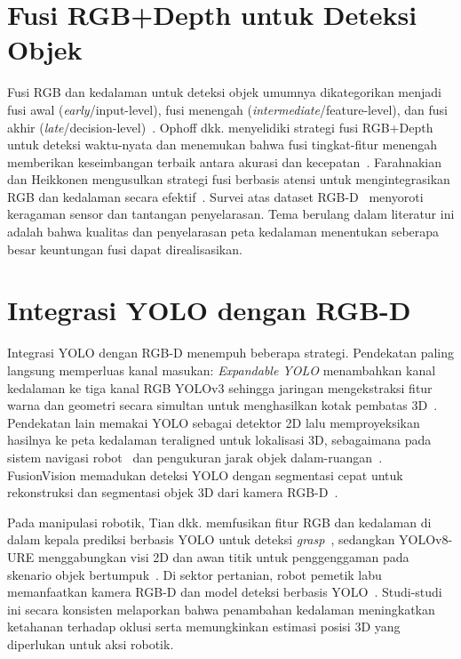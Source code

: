 \documentclass[11pt,a4paper]{article}
\begin{document}
\section{Fusi RGB+Depth untuk Deteksi Objek}
Fusi RGB dan kedalaman untuk deteksi objek umumnya dikategorikan menjadi fusi
awal (\emph{early}/input-level), fusi menengah (\emph{intermediate}/feature-level),
dan fusi akhir (\emph{late}/decision-level)~\cite{ramachandram2017multimodalreview,
feng2021multimodalsurvey}. Ophoff dkk. menyelidiki strategi fusi RGB+Depth untuk
deteksi waktu-nyata dan menemukan bahwa fusi tingkat-fitur menengah memberikan
keseimbangan terbaik antara akurasi dan kecepatan~\cite{ophoff2019multimodal}.
Farahnakian dan Heikkonen mengusulkan strategi fusi berbasis atensi untuk
mengintegrasikan RGB dan kedalaman secara efektif~\cite{farahnakian2021fusion}.
Survei atas dataset RGB-D~\cite{lopes2022rgbddatasets} menyoroti keragaman sensor
dan tantangan penyelarasan. Tema berulang dalam literatur ini adalah bahwa
kualitas dan penyelarasan peta kedalaman menentukan seberapa besar keuntungan
fusi dapat direalisasikan.

\section{Integrasi YOLO dengan RGB-D}
Integrasi YOLO dengan RGB-D menempuh beberapa strategi. Pendekatan paling
langsung memperluas kanal masukan: \emph{Expandable YOLO} menambahkan kanal
kedalaman ke tiga kanal RGB YOLOv3 sehingga jaringan mengekstraksi fitur warna
dan geometri secara simultan untuk menghasilkan kotak pembatas
3D~\cite{takahashi2020expandableyolo}. Pendekatan lain memakai YOLO sebagai
detektor 2D lalu memproyeksikan hasilnya ke peta kedalaman teraligned untuk
lokalisasi 3D, sebagaimana pada sistem navigasi robot~\cite{xu2024onboard} dan
pengukuran jarak objek dalam-ruangan~\cite{chen2023depthyolo}. FusionVision
memadukan deteksi YOLO dengan segmentasi cepat untuk rekonstruksi dan segmentasi
objek 3D dari kamera RGB-D~\cite{elamraoui2024fusionvision}.

Pada manipulasi robotik, Tian dkk. memfusikan fitur RGB dan kedalaman di dalam
kepala prediksi berbasis YOLO untuk deteksi \emph{grasp}~\cite{tian2023grasp},
sedangkan YOLOv8-URE menggabungkan visi 2D dan awan titik untuk penggenggaman
pada skenario objek bertumpuk~\cite{yang2025yolov8ure}. Di sektor pertanian,
robot pemetik labu memanfaatkan kamera RGB-D dan model deteksi berbasis
YOLO~\cite{ito2024pumpkin}. Studi-studi ini secara konsisten melaporkan bahwa
penambahan kedalaman meningkatkan ketahanan terhadap oklusi serta memungkinkan
estimasi posisi 3D yang diperlukan untuk aksi robotik.
\end{document}

